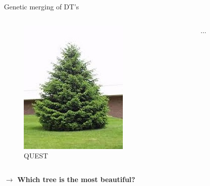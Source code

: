 \documentclass[english]{beamer}
\begin{document}
\begin{frame}{Genetic merging of DT's}
\begin{columns}
\begin{column}{0.25\textwidth}
\begin{figure}
				\includegraphics[width=\textwidth]{figures/spar.jpg}
				\caption{QUEST}
			\end{figure}
		\end{column}
		\begin{column}{0.25\textwidth}
			\centering
			$\ldots$
		\end{column}
	\end{columns}
	
	\textbf{$\rightarrow$ Which tree is the most beautiful?}
\end{frame}
\end{document}
